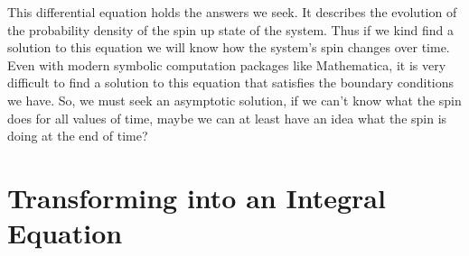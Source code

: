 This differential equation holds the answers we seek. 
It describes the evolution of the probability density of the spin up state of the system.
Thus if we kind find a solution to this equation we will know how the system's spin changes over time.
Even with modern symbolic computation packages like Mathematica, it is very difficult to find a solution to this equation that satisfies the boundary conditions we have.
So, we must seek an asymptotic solution, if we can't know what the spin does for all values of time, maybe we can at least have an idea what the spin is doing at the end of time?

\section{Transforming into an Integral Equation}

